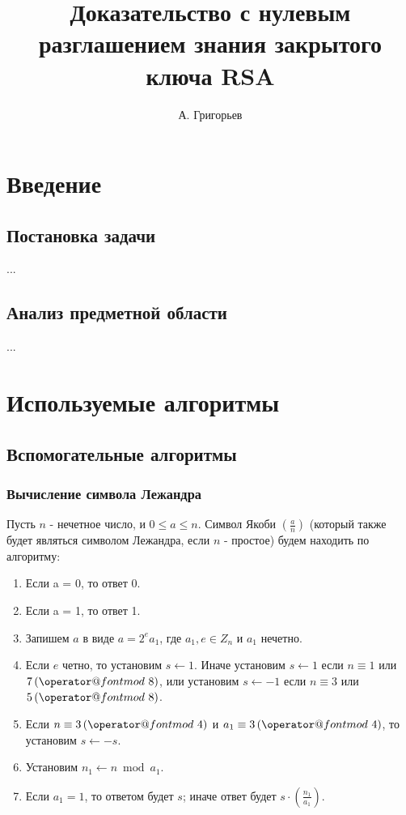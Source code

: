 \documentclass[12pt,a4paper]{report}
\author{А. Григорьев}
\title{Доказательство с нулевым разглашением знания закрытого ключа RSA}
\makeatletter
\def\imod#1{\allowbreak\,({\operator@font mod}\ #1)}
\def \jacobi #1#2{\left(\frac{#1}{#2}\right)}
\makeatother
\begin{document}
\maketitle
\tableofcontents

\chapter{Введение}



\section{Постановка задачи}

...

\section{Анализ предметной области}

...

\chapter{Используемые алгоритмы}

\section{Вспомогательные алгоритмы}

\subsection{Вычисление символа Лежандра}

Пусть $n$ - нечетное число, и $0 \leq a \le n$. Символ Якоби
$\jacobi{a}{n}$ (который также будет являться символом Лежандра,
если $n$ - простое) будем находить по алгоритму:

\begin{enumerate}
\item Если a = 0, то ответ 0.
\item Если a = 1, то ответ 1.
\item Запишем $a$ в виде  $a = 2^{e}a_1$, где $a_1, e \in Z_n$ и $a_1$ нечетно.
\item Если $e$ четно, то установим $s \leftarrow 1$. 
Иначе установим $s \leftarrow 1$ если $n \equiv 1$ или $7 \imod 8$, или
установим $s \leftarrow -1$ если $n \equiv 3$ или $5 \imod 8$.
\item Если $n \equiv 3 \imod 4$ и $a_1 \equiv 3 \imod 4$, то
установим $s \leftarrow -s$.
\item Установим $n_1 \leftarrow n \bmod{a_1}$.
\item Если $a_1 = 1$, то ответом будет $s$; иначе ответ будет
$s \cdot \jacobi{n_1}{a_1}$.
\end{enumerate}
\end{document}
